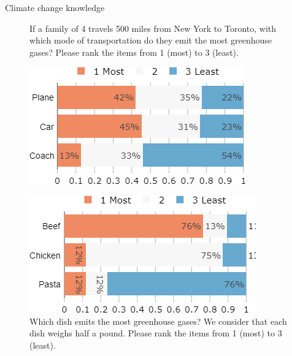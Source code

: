 \documentclass[aspectratio=169,9pt,dvipsnames]{beamer}
\begin{document}

\begin{frame}{Climate change knowledge}%
\begin{figure}[h!]
\centering
\caption{If a family of 4 travels 500 miles from New York to Toronto, with which mode of transportation do they emit the most greenhouse gases?
Please rank the items from 1 (most) to 3 (least).}
\includegraphics[width=.3\textwidth]{../figures/US/footprint_transport_US.png} \\
\centering
\caption{Which dish emits the most greenhouse gases? We consider that each dish weighs half a pound.
Please rank the items from 1 (most) to 3 (least).}
\includegraphics[width=.3\textwidth]{../figures/US/footprint_food_US.png}
\end{figure}
\end{frame}
\end{document}
